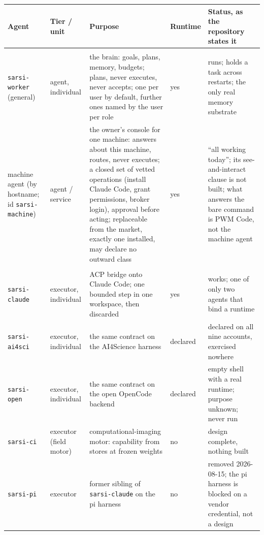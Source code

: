 \documentclass[11pt]{article}
\theoremstyle{definition}
\begin{document}
\begin{table}[!htbp]
\centering\scriptsize
\begin{tabularx}{\textwidth}{@{}>{\raggedright\arraybackslash}p{3.6cm}>{\raggedright\arraybackslash}p{1.7cm}Y>{\raggedright\arraybackslash}p{1.2cm}>{\raggedright\arraybackslash}p{2.9cm}@{}}
\toprule
Agent & Tier / unit & Purpose & Runtime & Status, as the repository states it \\
\midrule
{} \\
\texttt{sarsi-worker} (general) & agent, individual & the brain: goals, plans, memory, budgets; plans, never executes, never accepts; one per user by default, further ones named by the user per role & yes & runs; holds a task across restarts; the only real memory substrate \\
machine agent (by hostname; id \texttt{sarsi-machine}) & agent / service & the owner's console for one machine: answers about this machine, routes, never executes; a closed set of vetted operations (install Claude Code, grant permissions, broker login), approval before acting; replaceable from the market, exactly one installed, may declare no outward class & yes & ``all working today''; its see-and-interact clause is not built; what answers the bare command is PWM Code, not the machine agent \\
\midrule
{} \\
\texttt{sarsi-claude} & executor, individual & ACP bridge onto Claude Code; one bounded step in one workspace, then discarded & yes & works; one of only two agents that bind a runtime \\
\texttt{sarsi-ai4sci} & executor, individual & the same contract on the AI4Science harness & declared & declared on all nine accounts, exercised nowhere \\
\texttt{sarsi-open} & executor, individual & the same contract on the open OpenCode backend & declared & empty shell with a real runtime; purpose unknown; never run \\
\texttt{sarsi-ci} & executor (field motor) & computational-imaging motor: capability from stores at frozen weights & no & design complete, nothing built \\
\texttt{sarsi-pi} & executor & former sibling of \texttt{sarsi-claude} on the pi harness & no & removed 2026-08-15; the pi harness is blocked on a vendor credential, not a design \\

\end{tabularx}
\end{table}
\end{document}
